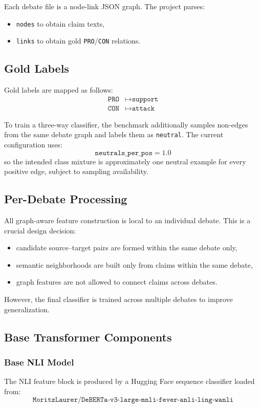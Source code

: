 \documentclass[11pt,a4paper]{article}
\begin{document}
Each debate file is a node-link JSON graph. The project parses:
\begin{itemize}[leftmargin=1.5em]
  \item \texttt{nodes} to obtain claim texts,
  \item \texttt{links} to obtain gold \texttt{PRO}/\texttt{CON} relations.
\end{itemize}

\subsection{Gold Labels}
Gold labels are mapped as follows:
\begin{align*}
\texttt{PRO} &\mapsto \texttt{support} \\
\texttt{CON} &\mapsto \texttt{attack}
\end{align*}

To train a three-way classifier, the benchmark additionally samples non-edges from the same debate graph and labels them as \texttt{neutral}. The current configuration uses:
\[
\texttt{neutrals\_per\_pos} = 1.0
\]
so the intended class mixture is approximately one neutral example for every positive edge, subject to sampling availability.

\subsection{Per-Debate Processing}
All graph-aware feature construction is local to an individual debate. This is a crucial design decision:
\begin{itemize}[leftmargin=1.5em]
  \item candidate source--target pairs are formed within the same debate only,
  \item semantic neighborhoods are built only from claims within the same debate,
  \item graph features are not allowed to connect claims across debates.
\end{itemize}

However, the final classifier is trained across multiple debates to improve generalization.

\subsection{Base Transformer Components}
\subsubsection{Base NLI Model}
The NLI feature block is produced by a Hugging Face sequence classifier loaded from:
\[
\texttt{MoritzLaurer/DeBERTa-v3-large-mnli-fever-anli-ling-wanli}
\]
\end{document}
